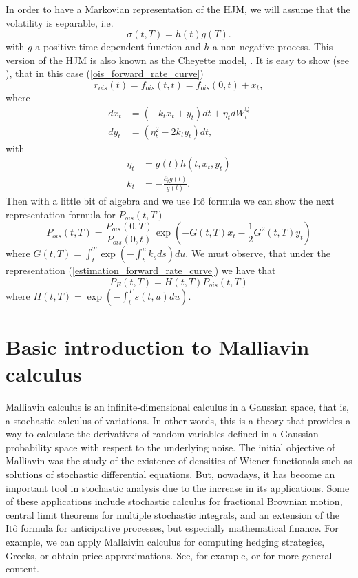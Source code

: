 \documentclass[a4paper,10pt]{article}
\newcommand{\1}{\mathbf{1}}
\begin{document}
In order to have a Markovian representation of the HJM, we will assume that the volatility is separable, i.e.
\begin{equation}
\sigma(t,T)= h(t)g(T).
\end{equation}
with $g$ a positive time-dependent function and $h$ a non-negative process. This version of the HJM is also known as the Cheyette model, \cite{Cheyette}. It is easy to show (see \cite{Andreasen01}), that in this case (\ref{ois_forward_rate_curve})
\begin{equation}
r_{ois}(t)=f_{ois}(t,t)= f_{ois}(0,t) + x_t,
\end{equation}  
where
\begin{align}\label{short_rate_cheyette}
dx_t &= (-k_t x_t + y_t)dt + \eta_t dW_t^{\mathbb{Q}} \nonumber \\
dy_t &= (\eta^{2}_t - 2 k_t y_t) dt ,
\end{align} 
with 
\begin{align*}
\eta_t &= g(t)h(t,x_t,y_t)  \nonumber \\
k_t &= - \frac{\partial_t g(t)}{g(t)}.
\end{align*}
Then with a little bit of algebra and we use Itô formula we can show the next representation formula for $P_{ois}(t,T)$
\begin{equation}\label{bond_ois}
P_{ois}(t,T) = \frac{P_{ois}(0,T)}{P_{ois}(0,t)} \exp\left(-G(t,T)x_t - \frac{1}{2} G^{2}(t,T)y_t \right)
\end{equation}
where $G(t,T) = \int_{t}^{T} \exp\left(-\int_{t}^{u} k_s ds \right) du$. We must observe, that under the representation (\ref{estimation_forward_rate_curve}) we have that
\begin{equation}\label{bond_forward}
P_{E}(t,T)=H(t,T)P_{ois}(t,T)
\end{equation}
where $H(t,T)=\exp\left(-\int_{t}^{T}s(t,u) du \right)$.

\section{Basic introduction to Malliavin calculus}\label{sec:Malliavin}
Malliavin calculus is an infinite-dimensional calculus in a Gaussian space, that is, a stochastic calculus of variations. In other words, this is a theory that provides a way to calculate the derivatives of random variables defined in a Gaussian probability space with respect to the underlying noise. The initial objective of Malliavin was the study of the existence of densities of Wiener functionals such as solutions of stochastic differential equations. But, nowadays, it has become an important tool in stochastic analysis due to the increase in its applications. Some of these applications include stochastic calculus for fractional Brownian motion, central limit theorems for multiple stochastic integrals, and an extension of the Itô formula for anticipative processes, but especially mathematical finance. For example, we can apply Mallaivin calculus for computing hedging strategies, Greeks, or obtain price approximations. See, for example, \cite{AlosLorite} or \cite{Nualart} for more general content.\\
\end{document}
